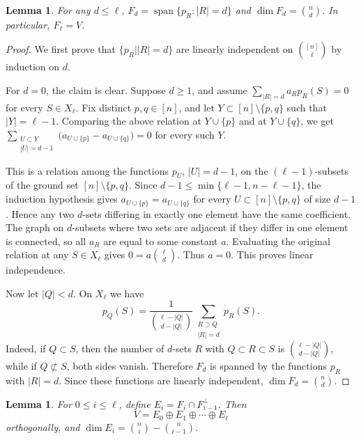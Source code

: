 \documentclass
[11pt,letterpaper]
{article}
\newtheorem{lemma}[theorem]{Lemma}
\newcommand{\X}{X_\ell}
\begin{document}
\begin{lemma}
For any $d \leq \ell$, $F_d=\operatorname{span}\{p_R: |R|=d\}$ and
$\dim F_d=\binom nd$. In particular, \(F_\ell=V\).
\end{lemma}

\begin{proof}
We first prove that $\{p_R | |R|=d\}$ are linearly independent on ${[n] \choose \ell}$ by induction on $d$.

For \(d=0\), the claim is clear. Suppose \(d\ge 1\), and assume $\sum_{|R|=d} a_R p_R(S)=0$
for every \(S\in\X\). Fix distinct \(p,q\in[n]\), and let $Y\subset [n]\setminus\{p,q\}$ such that $|Y|=\ell-1$.
Comparing the above relation at \(Y\cup\{p\}\) and at \(Y\cup\{q\}\), we get $\sum_{\substack{U\subset Y\\ |U|=d-1}}
\bigl(a_{U\cup\{p\}}-a_{U\cup\{q\}}\bigr)=0$
for every such \(Y\).

This is a relation among the functions \(p_U\), \(|U|=d-1\), on the \((\ell-1)\)-subsets of the ground set \([n]\setminus\{p,q\}\). Since
$d-1\le \min\{\ell-1,n-\ell-1\}$,
the induction hypothesis gives $a_{U\cup\{p\}}=a_{U\cup\{q\}}$ for every \(U\subset[n]\setminus\{p,q\}\) of size \(d-1\). Hence any two \(d\)-sets differing in exactly one element have the same coefficient. The graph on \(d\)-subsets where two sets are adjacent if they differ in one element is connected, so all \(a_R\) are equal to some constant \(a\). Evaluating the original relation at any \(S\in\X\) gives $0=a\binom{\ell}{d}$.
Thus \(a=0\). This proves linear independence.

Now let \(|Q|<d\). On \(\X\) we have
\[
p_Q(S)
=
\frac{1}{\binom{\ell-|Q|}{d-|Q|}}
\sum_{\substack{R\supset Q\\ |R|=d}} p_R(S).
\]
Indeed, if \(Q\subset S\), then the number of \(d\)-sets \(R\) with $Q\subset R\subset S$
is \(\binom{\ell-|Q|}{d-|Q|}\), while if \(Q\not\subset S\), both sides vanish. Therefore \(F_d\) is spanned by the functions \(p_R\) with \(|R|=d\). Since these functions are linearly independent, $\dim F_d=\binom nd$.
\end{proof}

\begin{lemma}
For \(0\le i\le \ell\), define $E_i=F_i\cap F_{i-1}^{\perp}$.
Then
\[
V=E_0\oplus E_1\oplus\cdots\oplus E_\ell
\]
orthogonally, and $\dim E_i=\binom ni-\binom n{i-1}$.
\end{lemma}
\end{document}

